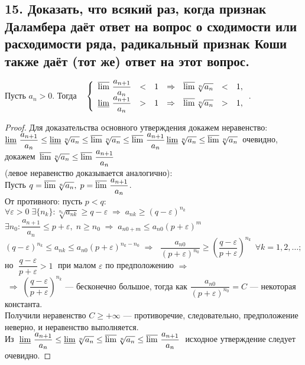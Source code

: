 \documentclass[a4paper, fleqn]{article}
\begin{document}
    \subsection*{15. Доказать, что всякий раз, когда признак Даламбера даёт ответ на вопрос о сходимости или расходимости ряда, 
	радикальный признак Коши также даёт (тот же) ответ на этот вопрос.}
        Пусть $a_n > 0$. Тогда 
	$\;\;\; \left\{\begin{array}{lllllll}
	\varlimsup \, \dfrac{a_{n+1}}{a_n} & < & 1 & \Rightarrow & \varlimsup \sqrt[n]{a_n} & < & 1,\\[5 pt]
	\varliminf \, \dfrac{a_{n+1}}{a_n} & > & 1 & \Rightarrow & \varlimsup \sqrt[n]{a_n} & > & 1,\\[5 pt]
	\end{array}\right.$. \\
	\begin{proof}
	Для доказательства основного утверждения докажем неравенство: \\[3 pt]
	$\varliminf \, \dfrac{a_{n+1}}{a_n} \le \varliminf \sqrt[n]{a_n} \le \varlimsup \sqrt[n]{a_n} \le \varlimsup \, \dfrac{a_{n+1}}{a_n} \\[3 pt]
	\varliminf \sqrt[n]{a_n} \le \varlimsup \sqrt[n]{a_n} \,$ очевидно, докажем 
	$\, \varlimsup \sqrt[n]{a_n} \le \varlimsup \, \dfrac{a_{n+1}}{a_n}$ \\[3 pt]
	(левое неравенство доказывается аналогично): \\[3 pt]
	Пусть $q = \varlimsup \sqrt[n]{a_n}, \; p = \varlimsup \, \dfrac{a_{n+1}}{a_n}$. \\[3 pt]
	От противного: пусть $p < q$:\\[3 pt]
	$\forall \varepsilon > 0 \; \exists \{ n_k \} : \sqrt[n_k]{a_{nk}} \ge q - \varepsilon \; \Rightarrow \; a_{nk} \ge (q - \varepsilon)^{n_k}$ \\[3 pt]
	$\exists n_0 : \dfrac{a_{n+1}}{a_n} \le p + \varepsilon, \; n \ge n_0 \; \Rightarrow \; a_{n0 + m} \le a_{n0} (p + \varepsilon)^m$ \\[3 pt]
	$(q - \varepsilon)^{n_k} \le a_{nk} \le a_{n0} (p + \varepsilon)^{n_k - n_0} \; \Rightarrow \; $
	$\dfrac{a_{n0}}{(p + \varepsilon)^{n_0}} \ge \left( \dfrac{q - \varepsilon}{p + \varepsilon} \right)^{n_k} \;\, \forall k = 1, 2, \dots;$ \\[3 pt]
	но $\; \dfrac{q - \varepsilon}{p + \varepsilon} > 1 \; $ при малом $\varepsilon$ по предположению $\Rightarrow$ \\[3 pt]
	$\; \Rightarrow \; \left( \dfrac{q - \varepsilon}{p + \varepsilon} \right)^{n_k}$ --- бесконечно большое, тогда как
	$\dfrac{a_{n0}}{(p + \varepsilon)^{n_0}} = C$ --- некоторая константа. \\[3 pt]
	Получили неравенство $C \ge +\infty$ --- противоречие, следовательно, предположение неверно, и неравенство выполняется. \\[3 pt]
	Из $\; \varliminf \, \dfrac{a_{n+1}}{a_n} \le \varliminf \sqrt[n]{a_n} \le \varlimsup \sqrt[n]{a_n} \le \varlimsup \, \dfrac{a_{n+1}}{a_n}\; $ 
        исходное утверждение следует очевидно.
    \end{proof}    
\end{document}
